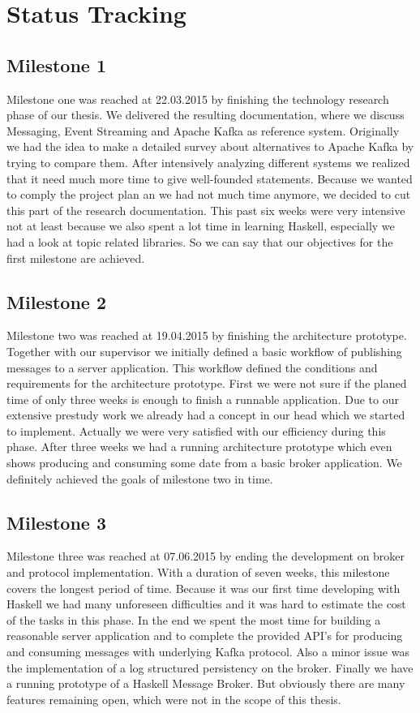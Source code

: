 \section*{Status Tracking}
\label{sec:status-tracking}

\subsection*{Milestone 1}
Milestone one was reached at 22.03.2015 by finishing the technology research
phase of our thesis. We delivered the resulting documentation, where we discuss
Messaging, Event Streaming and Apache Kafka as reference system. Originally we
had the idea to make a detailed survey about alternatives to Apache Kafka by
trying to compare them. After intensively analyzing different systems we
realized that it need much more time to give well-founded statements. Because we
wanted to comply the project plan an we had not much time anymore, we decided to
cut this part of the research documentation. This past six weeks were very
intensive not at least because we also spent a lot time in learning Haskell,
especially we had a look at topic related libraries. So we can say that our
objectives for the first milestone are achieved.

\subsection*{Milestone 2}
Milestone two was reached at 19.04.2015 by finishing the architecture prototype.
Together with our supervisor we initially defined a basic workflow of publishing
messages to a server application. This workflow defined the conditions and
requirements for the architecture prototype. First we were not sure if the
planed time of only three weeks is enough to finish a runnable application. Due
to our extensive prestudy work we already had a concept in our head which we
started to implement. Actually we were very satisfied with our efficiency during
this phase. After three weeks we had a running architecture prototype which even
shows producing and consuming some date from a basic broker application. We
definitely achieved the goals of milestone two in time. 

\subsection*{Milestone 3} 
Milestone three was reached at 07.06.2015 by ending the
development on broker and protocol implementation. With a duration of seven
weeks, this milestone covers the longest period of time. Because it was our
first time developing with Haskell we had many unforeseen difficulties and it was
hard to estimate the cost of the tasks in this phase. In the end we spent the
most time for building a reasonable server application and to complete the
provided API's for producing and consuming messages with underlying Kafka
protocol. Also a minor issue was the implementation of a log structured
persistency on the broker. Finally we have a running prototype of a Haskell
Message Broker. But obviously there are many features remaining open, which were
not in the scope of this thesis. 

